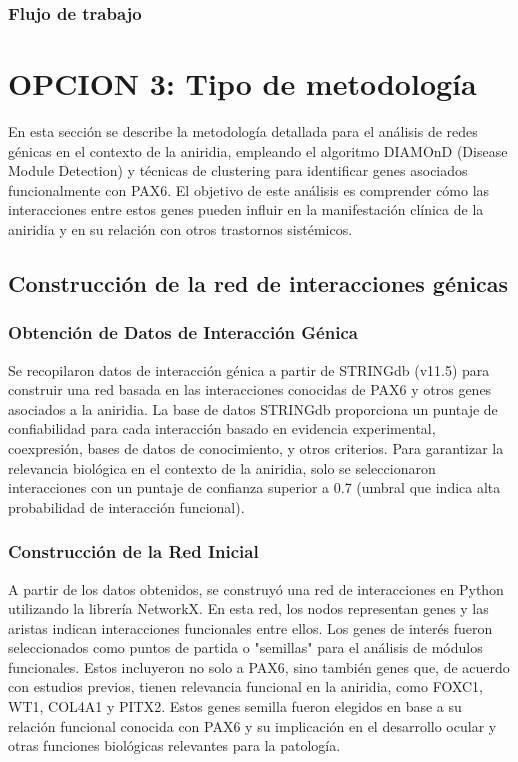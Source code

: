 \subsubsection{Flujo de trabajo}

\newpage

\section{OPCION 3: Tipo de metodología}

En esta sección se describe la metodología detallada para el análisis de redes génicas en el contexto de la aniridia, empleando el algoritmo DIAMOnD (Disease Module Detection) y técnicas de clustering para identificar genes asociados funcionalmente con PAX6. El objetivo de este análisis es comprender cómo las interacciones entre estos genes pueden influir en la manifestación clínica de la aniridia y en su relación con otros trastornos sistémicos.

\subsection{Construcción de la red de interacciones génicas}

\subsubsection{Obtención de Datos de Interacción Génica}

Se recopilaron datos de interacción génica a partir de STRINGdb (v11.5) para construir una red basada en las interacciones conocidas de PAX6 y otros genes asociados a la aniridia. La base de datos STRINGdb proporciona un puntaje de confiabilidad para cada interacción basado en evidencia experimental, coexpresión, bases de datos de conocimiento, y otros criterios. Para garantizar la relevancia biológica en el contexto de la aniridia, solo se seleccionaron interacciones con un puntaje de confianza superior a 0.7 (umbral que indica alta probabilidad de interacción funcional).

\subsubsection{Construcción de la Red Inicial}

A partir de los datos obtenidos, se construyó una red de interacciones en Python utilizando la librería NetworkX. En esta red, los nodos representan genes y las aristas indican interacciones funcionales entre ellos. Los genes de interés fueron seleccionados como puntos de partida o "semillas" para el análisis de módulos funcionales. Estos incluyeron no solo a PAX6, sino también genes que, de acuerdo con estudios previos, tienen relevancia funcional en la aniridia, como FOXC1, WT1, COL4A1 y PITX2. Estos genes semilla fueron elegidos en base a su relación funcional conocida con PAX6 y su implicación en el desarrollo ocular y otras funciones biológicas relevantes para la patología.

